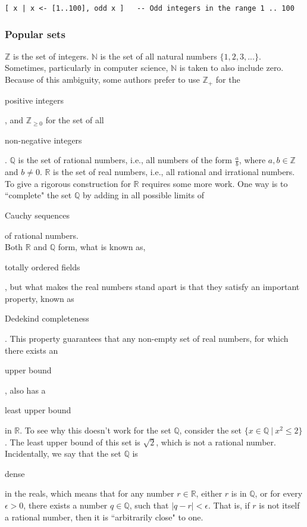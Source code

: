 \documentclass[11pt]{article}
\theoremstyle{plain}
\theoremstyle{definition}
\begin{document}
\begin{verbatim}
[ x | x <- [1..100], odd x ]   -- Odd integers in the range 1 .. 100
\end{verbatim}

\subsubsection*{Popular sets}

$ \mathbb{Z} $ is the set of integers. 
$ \mathbb{N} $ is the set of all natural numbers $ \{ 1, 2, 3, ... \} $. Sometimes, particularly in computer science, $ \mathbb{N} $ is taken to also include zero. Because of this ambiguity, some authors prefer to use $ \mathbb{Z}_+ $ for the \begin{em}positive integers\end{em}, and $ \mathbb{Z}_{\ge 0} $ for the set of all \begin{em}non-negative integers\end{em}.
$ \mathbb{Q} $ is the set of rational numbers, i.e., all numbers of the form $ \frac{a}{b} $, where $ a, b \in \mathbb{Z} $ and $ b \neq 0 $.
$ \mathbb{R} $ is the set of real numbers, i.e., all rational and irrational numbers. 
To give a rigorous construction for $ \mathbb{R} $ requires some more work. One way is to ``complete" the set $ \mathbb{Q} $ by adding in all possible limits of \begin{em}Cauchy sequences\end{em} of rational numbers. \\

\noindent Both $ \mathbb{R} $ and $ \mathbb{Q} $ form, what is known as, \begin{em}totally ordered fields\end{em}, but what makes the real numbers stand apart is that they satisfy an important property, known as \begin{em}Dedekind completeness\end{em}.
This property guarantees that any non-empty set of real numbers, for which there exists an \begin{em}upper bound\end{em}, also has a \begin{em}least upper bound\end{em} in $ \mathbb{R} $.
To see why this doesn't work for the set $ \mathbb{Q} $, consider the set $ \{ x \in \mathbb{Q} \ | \ x^2 \le 2 \} $. The least upper bound of this set is $ \sqrt{2} $, which is not a rational number.
Incidentally, we say that the set $ \mathbb{Q} $ is \begin{em}dense\end{em} in the reals, which means that for any number $ r \in \mathbb{R} $, either $ r $ is in $ \mathbb{Q} $, or for every $ \epsilon > 0$, there exists a number $ q \in \mathbb{Q} $, such that $ | q - r | < \epsilon $. That is, if $ r $ is not itself a rational number, then it is ``arbitrarily close" to one.
\end{document}
